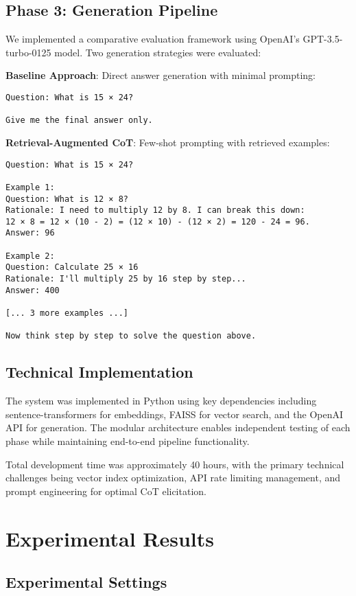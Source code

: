 \documentclass{article}
\begin{document}
\subsection{Phase 3: Generation Pipeline}

We implemented a comparative evaluation framework using OpenAI's GPT-3.5-turbo-0125 model. Two generation strategies were evaluated:

\textbf{Baseline Approach}: Direct answer generation with minimal prompting:
\begin{verbatim}
Question: What is 15 × 24?

Give me the final answer only.
\end{verbatim}

\textbf{Retrieval-Augmented CoT}: Few-shot prompting with retrieved examples:
\begin{verbatim}
Question: What is 15 × 24?

Example 1:
Question: What is 12 × 8?
Rationale: I need to multiply 12 by 8. I can break this down:
12 × 8 = 12 × (10 - 2) = (12 × 10) - (12 × 2) = 120 - 24 = 96.
Answer: 96

Example 2:
Question: Calculate 25 × 16
Rationale: I'll multiply 25 by 16 step by step...
Answer: 400

[... 3 more examples ...]

Now think step by step to solve the question above.
\end{verbatim}

\subsection{Technical Implementation}

The system was implemented in Python using key dependencies including sentence-transformers for embeddings, FAISS for vector search, and the OpenAI API for generation. The modular architecture enables independent testing of each phase while maintaining end-to-end pipeline functionality.

Total development time was approximately 40 hours, with the primary technical challenges being vector index optimization, API rate limiting management, and prompt engineering for optimal CoT elicitation.

\section{Experimental Results}

\subsection{Experimental Settings}
\end{document}
